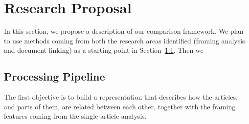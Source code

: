 \chapter{Research Proposal}
\label{chap:proposal}






In this section, we propose a description of our comparison framework.
We plan to use methods coming from both the research areas identified (framing analysis and document linking) as a starting point in Section~\ref{sec:prop_pipeline}. Then we 

\section{Processing Pipeline}
\label{sec:prop_pipeline}
The first objective is to build a representation that describes how the articles, and parts of them, are related between each other, together with the framing features coming from the single-article analysis.


